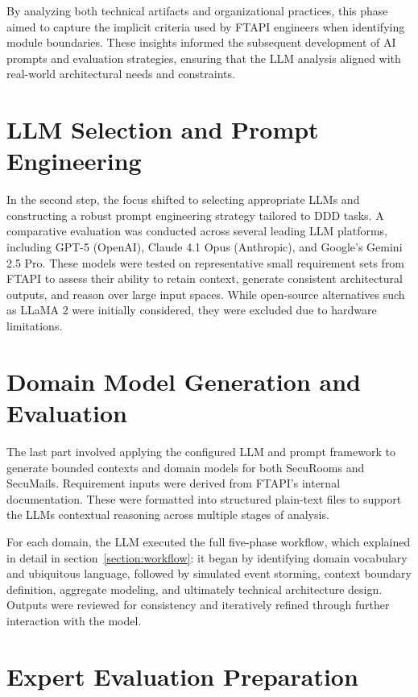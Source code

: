 By analyzing both technical artifacts and organizational practices, this phase aimed to capture the implicit criteria used by FTAPI engineers when identifying module boundaries. These insights informed the subsequent development of AI prompts and evaluation strategies, ensuring that the LLM analysis aligned with real-world architectural needs and constraints.

\section{LLM Selection and Prompt Engineering}

In the second step, the focus shifted to selecting appropriate LLMs and constructing a robust prompt engineering strategy tailored to DDD tasks. A comparative evaluation was conducted across several leading LLM platforms, including GPT-5 (OpenAI), Claude 4.1 Opus (Anthropic), and Google's Gemini 2.5 Pro. These models were tested on representative small requirement sets from FTAPI to assess their ability to retain context, generate consistent architectural outputs, and reason over large input spaces. While open-source alternatives such as LLaMA 2 were initially considered, they were excluded due to hardware limitations.

\section{Domain Model Generation and Evaluation}

The last part involved applying the configured LLM and prompt framework to generate bounded contexts and domain models for both SecuRooms and SecuMails. Requirement inputs were derived from FTAPI's internal documentation. These were formatted into structured plain-text files to support the LLMs contextual reasoning across multiple stages of analysis.

For each domain, the LLM executed the full five-phase workflow, which explained in detail in section~\ref{section:workflow}: it began by identifying domain vocabulary and ubiquitous language, followed by simulated event storming, context boundary definition, aggregate modeling, and ultimately technical architecture design. Outputs were reviewed for consistency and iteratively refined through further interaction with the model.

\section{Expert Evaluation Preparation}

